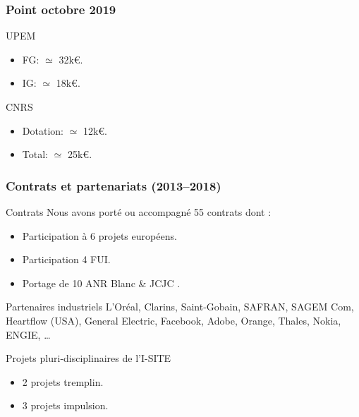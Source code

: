 \documentclass[]{beamer}
\begin{document}

\begin{frame}
  \frametitle{Point octobre 2019}

  \begin{block}{UPEM}
    \begin{itemize}
      \item FG: $\simeq$ 32k\euro.
      \item IG: $\simeq$ 18k\euro.
    \end{itemize}
  \end{block}

  \begin{block}{CNRS}
    \begin{itemize}
      \item Dotation: $\simeq$ 12k\euro.
      \item Total: $\simeq$ 25k\euro.
    \end{itemize}
  \end{block}

\end{frame}


\begin{frame}[fragile]
  \frametitle{Contrats et partenariats (2013--2018)}

  \begin{block}{Contrats}
    Nous avons porté ou accompagné 55 contrats dont :
    \begin{itemize}
      \item Participation à 6 projets européens.
      \item Participation 4 FUI.
      \item Portage de 10 ANR Blanc \& JCJC .
    \end{itemize}
  \end{block}

  \begin{block}{Partenaires industriels}
    L'Oréal, Clarins, Saint-Gobain, SAFRAN, SAGEM Com, Heartflow (USA),
    General Electric, Facebook, Adobe, Orange, Thales, Nokia, ENGIE, \dots
  \end{block}

  \begin{block}{Projets pluri-disciplinaires de l'I-SITE}
  	\begin{itemize}
    	\item 2 projets tremplin.
    	\item 3 projets impulsion.
  	\end{itemize}
  \end{block}

\end{frame}
\end{document}
